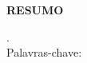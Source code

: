 \begin{center}
  \textbf{RESUMO}
\end{center}
\singlespacing

\noindent . \\

\noindent Palavras-chave:
